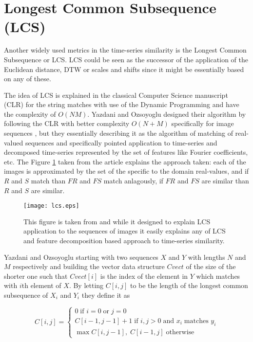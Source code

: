 \section{Longest Common Subsequence (LCS) } \label{lcs}
Another widely used metrics in the time-series similarity is the Longest Common Subsequence or LCS. LCS could be seen as the successor of the application of the Euclidean distance, DTW or scales and shifts \cite{citeulike:3816327} since it might be essentially based on any of these. 

The idea of LCS is explained in the classical Computer Science manuscript \cite{citeulike:180287} (CLR) for the string matches with use of the Dynamic Programming and have the complexity of $O(NM)$. Yazdani and Ozsoyoglu designed their algorithm by following the CLR with better complexity $O(N+M)$ specifically for image sequences \cite{citeulike:4367061}, but they essentially describing it as the algorithm of matching of real-valued sequences and specifically pointed application to time-series and decomposed time-series represented by the set of features like Fourier coefficients, etc. The Figure \ref{fig:lcs} taken from the article explains the approach taken: each of the images is approximated by the set of the specific to the domain real-values, and if $R$ and $S$ match than $FR$ and $FS$ match anlagously, if $FR$ and $FS$ are similar than $R$ and $S$ are similar.

\begin{figure}[tbp]
   \centering
   \texttt{[image: lcs.eps]}
   \caption{This figure is taken from \cite{citeulike:4367061} and while it designed to explain LCS application to the sequences of images it easily explains any of LCS and feature decomposition based approach to time-series similarity.}
   \label{fig:lcs}
\end{figure} 

Yazdani and Ozsoyoglu starting with two sequences $X$ and $Y$ with lengths $N$ and $M$ respectively and building the vector data structure $Cvect$ of the size of the shorter one such that $Cvect[i]$ is the index of the element in $Y$ which matches with $i$th element of $X$. By letting $C[i,j]$ to be the length of the longest common subsequence of $X_{i}$ and $Y_{i}$ they define it as 

\begin{equation}
 C[i,j] = 
 \begin{cases} 
  0 \; \text{if } i=0 \; \text{or} \; j=0 \\
  C[i-1,j-1]+1 \; \text{if } i,j>0 \; \text{and } x_{i} \; \text{matches } y_{i} \\
  \max{C[i,j-1], \;C[i-1,j]} \; \text{otherwise}
 \end{cases}
\label{eq:lcs}
\end{equation}

